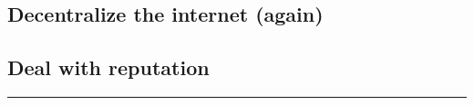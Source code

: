 \documentclass{sigchi}
\begin{document}
\subsection{Decentralize the internet (again)}
\subsection{Deal with reputation}







\rule{\linewidth}{1pt}











\end{document}
